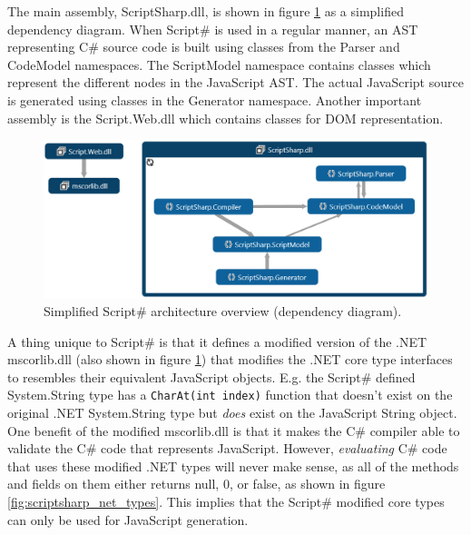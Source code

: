 		The main assembly, ScriptSharp.dll, is shown in figure \ref{simplifiedOverview} as a simplified dependency diagram. When Script\# is used in a regular manner, an AST representing C\# source code is built using classes from the Parser and CodeModel namespaces. The ScriptModel namespace contains classes which represent the different nodes in the JavaScript AST. The actual JavaScript source is generated using classes in the Generator namespace. Another important assembly is the Script.Web.dll which contains classes for DOM representation.

		\begin{figure}[H]
			\begin{center}
				\centerline{\includegraphics[width=16cm]{resources/images/SimplifiedOverview.png}}
			\end{center}
			\caption{Simplified Script\# architecture overview (dependency diagram).}
			\label{simplifiedOverview}
		\end{figure}


		A thing unique to Script\# is that it defines a modified version of the .NET mscorlib.dll (also shown in figure \ref{simplifiedOverview}) that modifies the .NET core type interfaces to resembles their equivalent JavaScript objects. E.g. the Script\# defined System.String type has a \texttt{CharAt(int index)} function that doesn't exist on the original .NET System.String type but \emph{does} exist on the JavaScript String object. One benefit of the modified mscorlib.dll is that it makes the C\# compiler able to validate the C\# code that represents JavaScript. However, \emph{evaluating} C\# code that uses these modified .NET types will never make sense, as all of the methods and fields on them either returns null, 0, or false, as shown in figure \ref{fig:scriptsharp_net_types}. This implies that the Script\# modified core types can only be used for JavaScript generation.

